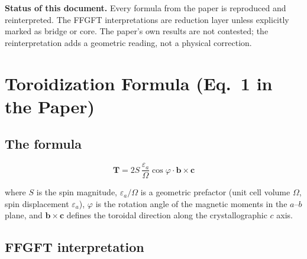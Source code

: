 \noindent\textbf{Status of this document.} Every formula from the paper is
reproduced and reinterpreted. The FFGFT interpretations are reduction layer
unless explicitly marked as bridge or core. The paper's own results are not
contested; the reinterpretation adds a geometric reading, not a physical
correction.

\section{Toroidization Formula (Eq.~1 in the Paper)}

\subsection*{The formula}

\begin{equation}
  \mathbf{T} = 2S\,\frac{\varepsilon_a}{\Omega}\cos\varphi \cdot \mathbf{b}
  \times \mathbf{c}
  \tag{Paper~Eq.~1}
\end{equation}

\noindent where $S$ is the spin magnitude, $\varepsilon_a/\Omega$ is a
geometric prefactor (unit cell volume $\Omega$, spin displacement $\varepsilon_a$),
$\varphi$ is the rotation angle of the magnetic moments in the $a$--$b$ plane,
and $\mathbf{b}\times\mathbf{c}$ defines the toroidal direction along the
crystallographic $c$ axis.

\subsection*{FFGFT interpretation}

